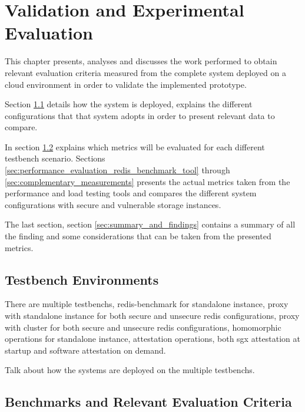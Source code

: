 
\chapter{Validation and Experimental Evaluation}
\label{cha:validation_experimental_Evaluation}

This chapter presents, analyses and discusses the work performed to obtain relevant evaluation criteria measured from the complete system deployed on a cloud environment in order to validate the implemented prototype.

Section \ref{sec:testbench_environment} details how the system is deployed, explains the different configurations that that system adopts in order to present relevant data to compare.

In section \ref{sec:benchmarks_and_revelant_evaluation_criteria} explains which metrics will be evaluated for each different testbench scenario. Sections \ref{sec:performance_evaluation_redis_benchmark_tool} through \ref{sec:complementary_measurements} presents the actual metrics taken from the performance and load testing tools and compares the different system configurations with secure and vulnerable storage instances.

The last section, section \ref{sec:summary_and_findings} contains a summary of all the finding and some considerations that can be taken from the presented metrics.

\section{Testbench Environments}
\label{sec:testbench_environment}

There are multiple testbenchs, redis-benchmark for standalone instance, proxy with standalone instance for both secure and unsecure redis configurations, proxy with cluster for both secure and unsecure redis configurations, homomorphic operations for standalone instance, attestation operations, both sgx attestation at startup and software attestation on demand.

Talk about how the systems are deployed on the multiple testbenchs.

\section{Benchmarks and Relevant Evaluation Criteria}
\label{sec:benchmarks_and_revelant_evaluation_criteria}

